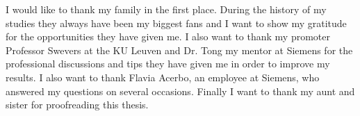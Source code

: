 \documentclass[master=elt,masteroption=eg,english]{kulemt}
\begin{document}

\begin{preface}
	I would like to thank my family in the first place. During the history of my studies they always have been my biggest fans and I want to show my gratitude for the opportunities they have given me. I also want to thank my promoter Professor Swevers at the KU Leuven and Dr. Tong my mentor at Siemens for the professional discussions and tips they have given me in order to improve my results. I also want to thank Flavia Acerbo, an employee at Siemens, who answered my questions on several occasions. Finally I want to thank my aunt and sister for proofreading this thesis.

\end{preface}

\tableofcontents*
\end{document}
